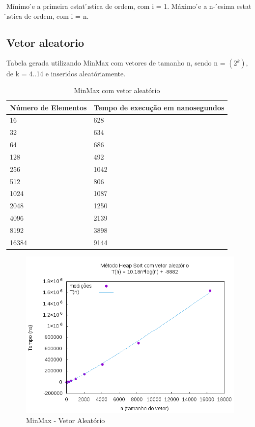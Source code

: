 \documentclass[12pt,a4paper,twoside]{report}
\begin{document}
Mínimo  ́e a primeira estat ́ıstica de ordem, com i = 1.
Máximo  ́e a n- ́esima estat ́ıstica de ordem, com i = n.

\subsection{Vetor aleatorio}
Tabela gerada utilizando MinMax com vetores de tamanho n, sendo n = $(2^k)$, de k = 4..14 e inseridos aleatóriamente.
\begin{table}[H]
\centering
\caption{MinMax com vetor aleatório}
\label{my-label}
\begin{tabular}{|l|l|}
\hline
\multicolumn{1}{|c|}{\textbf{Número de Elementos}} & \multicolumn{1}{c|}{\textbf{Tempo de execução em nanosegundos}} \\ \hline
16 & 628 \\ \hline
32 & 634 \\ \hline
64 & 686 \\ \hline
128 & 492 \\ \hline
256 & 1042 \\ \hline
512 & 806 \\ \hline
1024 & 1087 \\ \hline
2048 & 1250 \\ \hline
4096 & 2139 \\ \hline
8192 & 3898 \\ \hline
16384 & 9144 \\ \hline
\end{tabular}
\end{table}

\begin{figure}[H]
    \centering
    \includegraphics[width=0.7\linewidth]{graficos/HeapSort/vIntAleatorio/vIntAleatorio.png}
  \caption{MinMax - Vetor Aleatório}
\end{figure}
\end{document}
